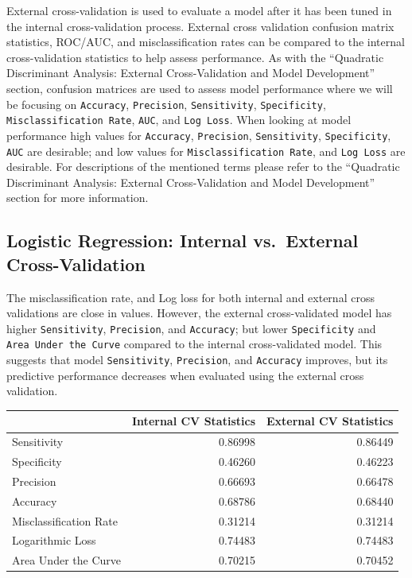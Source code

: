 \documentclass[american,]{article}
\begin{document}
External cross-validation is used to evaluate a model after it has been tuned in the internal cross-validation process. External cross validation confusion matrix statistics, ROC/AUC, and misclassification rates can be compared to the internal cross-validation statistics to help assess performance. As with the ``Quadratic Discriminant Analysis: External Cross-Validation and Model Development'' section, confusion matrices are used to assess model performance where we will be focusing on \texttt{Accuracy}, \texttt{Precision}, \texttt{Sensitivity}, \texttt{Specificity}, \texttt{Misclassification\ Rate}, \texttt{AUC}, and \texttt{Log\ Loss}. When looking at model performance high values for \texttt{Accuracy}, \texttt{Precision}, \texttt{Sensitivity}, \texttt{Specificity}, \texttt{AUC} are desirable; and low values for \texttt{Misclassification\ Rate}, and \texttt{Log\ Loss} are desirable. For descriptions of the mentioned terms please refer to the ``Quadratic Discriminant Analysis: External Cross-Validation and Model Development'' section for more information.

\hypertarget{logistic-regression-internal-vs.external-cross-validation}{%
\subsection{\texorpdfstring{\textbf{Logistic Regression: Internal vs.~External Cross-Validation}}{Logistic Regression: Internal vs.~External Cross-Validation}}\label{logistic-regression-internal-vs.external-cross-validation}}

The misclassification rate, and Log loss for both internal and external cross validations are close in values. However, the external cross-validated model has higher \texttt{Sensitivity}, \texttt{Precision}, and \texttt{Accuracy}; but lower \texttt{Specificity} and \texttt{Area\ Under\ the\ Curve} compared to the internal cross-validated model. This suggests that model \texttt{Sensitivity}, \texttt{Precision}, and \texttt{Accuracy} improves, but its predictive performance decreases when evaluated using the external cross validation.

\begin{table}[H]
\centering
\begin{tabular}{lrr}
\toprule
  & Internal CV Statistics & External CV Statistics\\
\midrule
\rowcolor{gray!6}  Sensitivity & 0.86998 & 0.86449\\
Specificity & 0.46260 & 0.46223\\
\rowcolor{gray!6}  Precision & 0.66693 & 0.66478\\
Accuracy & 0.68786 & 0.68440\\
\rowcolor{gray!6}  Misclassification Rate & 0.31214 & 0.31214\\
\addlinespace
Logarithmic Loss & 0.74483 & 0.74483\\
\rowcolor{gray!6}  Area Under the Curve & 0.70215 & 0.70452\\
\bottomrule
\end{tabular}
\end{table}
\end{document}
